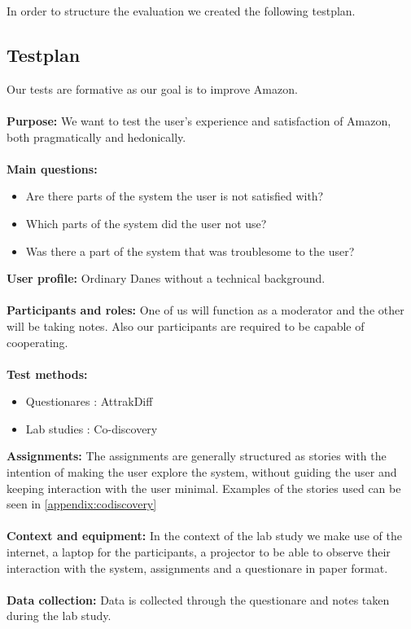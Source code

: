 In order to structure the evaluation we created the following testplan.

\subsection{Testplan}
Our tests  are formative as our goal is to improve Amazon. \\ \\
\textbf{Purpose:} We want to test the user's experience and satisfaction of Amazon, both pragmatically and hedonically. \\ \\
\textbf{Main questions:}
\begin{itemize}
\item Are there parts of the system the user is not satisfied with?
\item Which parts of the system did the user not use?
\item Was there a part of the system that was troublesome to the user?
\end{itemize}
\textbf{User profile:}
Ordinary Danes without a technical background. \\ \\
\textbf{Participants and roles:}
One of us will function as a moderator and the other will be taking notes. Also our participants are required to be capable of cooperating. \\ \\
\textbf{Test methods:}
\begin{itemize}
\item Questionares : AttrakDiff
\item Lab studies : Co-discovery
\end{itemize}
\textbf{Assignments:} The assignments are generally structured as stories with the intention of making the user explore the system, without guiding the user and keeping interaction with the user minimal. Examples of the stories used can be seen in \autoref{appendix:codiscovery} \\ \\
\textbf{Context and equipment:} In the context of the lab study we make use of the internet, a laptop for the participants, a projector to be able to observe their interaction with the system, assignments and a questionare in paper format. \\ \\
\textbf{Data collection:} Data is collected through the questionare and notes taken during the lab study.

